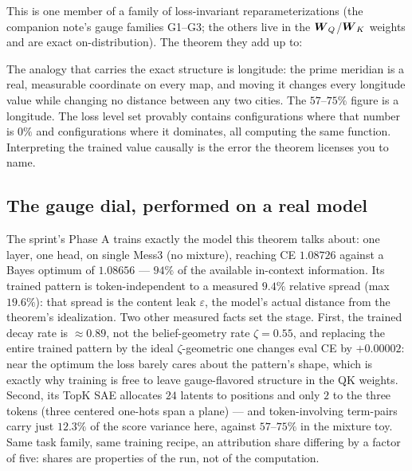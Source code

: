 \documentclass{article}
\begin{document}
This is one member of a family of loss-invariant reparameterizations (the companion note's gauge families G1--G3; the others live in the $\boldsymbol{W}_Q$/$\boldsymbol{W}_K$ weights and are exact on-distribution). The theorem they add up to:

\begin{center}
\end{center}

The analogy that carries the exact structure is longitude: the prime meridian is a real, measurable coordinate on every map, and moving it changes every longitude value while changing no distance between any two cities. The $57$--$75\%$ figure is a longitude. The loss level set provably contains configurations where that number is $0\%$ and configurations where it dominates, all computing the same function. Interpreting the trained value causally is the error the theorem licenses you to name.

\subsection{The gauge dial, performed on a real model}

The sprint's Phase A trains exactly the model this theorem talks about: one layer, one head, on single Mess3 (no mixture), reaching CE $1.08726$ against a Bayes optimum of $1.08656$ --- $94\%$ of the available in-context information. Its trained pattern is token-independent to a measured $9.4\%$ relative spread (max $19.6\%$): that spread is the content leak $\varepsilon$, the model's actual distance from the theorem's idealization. Two other measured facts set the stage. First, the trained decay rate is $\approx 0.89$, not the belief-geometry rate $\zeta = 0.55$, and replacing the entire trained pattern by the ideal $\zeta$-geometric one changes eval CE by $+0.00002$: near the optimum the loss barely cares about the pattern's shape, which is exactly why training is free to leave gauge-flavored structure in the QK weights. Second, its TopK SAE allocates $24$ latents to positions and only $2$ to the three tokens (three centered one-hots span a plane) --- and token-involving term-pairs carry just $12.3\%$ of the score variance here, against $57$--$75\%$ in the mixture toy. Same task family, same training recipe, an attribution share differing by a factor of five: shares are properties of the run, not of the computation.
\end{document}

